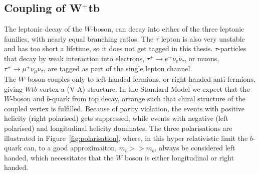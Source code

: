 \documentclass[12pt,a4paper]{article}
\numberwithin{equation}{section}
\begin{document}
\subsection{Coupling of W$^+$tb}\label{sec:coupling}
The leptonic decay of the $W$-boson, can decay into either of the three leptonic
families, with nearly equal branching ratios. The $\tau$ lepton is also very
unstable and has too short a lifetime, so it does not get tagged in this thesis.
$\tau$-particles that decay by weak interaction into electrons,
$\tau^+ \rightarrow e^+ \nu_e \bar \nu_{\tau}$, or muons, $\tau^+ \rightarrow \mu^+ \nu_\mu \bar \nu_{\tau}$, are tagged as part of
the single lepton channel.\\

The $W$-boson couples only to left-handed fermions, or right-handed
anti-fermions, giving $Wtb$ vortex a (V-A) structure. In the Standard Model we
expect that the $W$-boson and $b$-quark from top decay, arrange such that chiral
structure of the coupled vertex is fulfilled. Because of parity violation, the
events with positive helicity (right polarised) gets suppressed, while events
with negative (left polarised) and longitudinal helicity dominates. The three
polarisations are illustrated in Figure~\ref{fig:polarisation}, where, in this
hyper relativistic limit the $b$-quark can, to a good approximaiton,
$m_t >> m_b$, always be considered left handed, which necessitates that the $W$
boson is either longitudinal or right handed.
\end{document}
